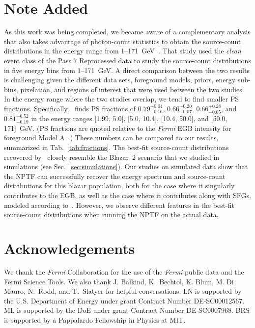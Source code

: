 \section*{Note Added}

As this work was being completed, we became aware of a complementary analysis that also takes advantage of photon-count statistics to obtain the source-count distributions in the energy range from 1--171~GeV~\cite{Zechlin:2016pme}.  That study used the {\it clean} event class of the Pass 7 Reprocessed data to study the source-count distributions in five energy bins from 1--171~GeV.  A direct comparison between the two results is challenging given the different data sets, foreground models, priors, energy sub-bins, pixelation, and regions of interest that were used between the two studies.  In the energy range where the two studies overlap, we tend to find smaller PS fractions.   %
Specifically,~\cite{Zechlin:2016pme} finds PS fractions of  $0.79_{-0.16}^{+0.04}$, $0.66_{-0.07}^{+0.20}$, $0.66_{-0.05}^{+0.28}$, and $0.81_{-0.19}^{+0.52}$ in the energy ranges [1.99, 5.0], [5.0, 10.4], [10.4, 50.0], and [50.0, 171]~GeV.  (PS fractions are quoted relative to the \emph{Fermi} EGB intensity for foreground Model A~\cite{Ackermann:2014usa}.)  These numbers can be compared to our results, summarized in Tab.~\ref{tab:fractions}.  The best-fit source-count distributions recovered by~\cite{Zechlin:2016pme} closely resemble the Blazar--2 scenario that we studied in simulations (see Sec.~\ref{sec:simulations}).  Our studies on simulated data show that the NPTF can successfully recover the energy spectrum and source-count distributions for this blazar population, both for the case where it singularly contributes to the EGB, as well as the case where it contributes along with SFGs, modeled according to~\cite{Tamborra:2014xia}.  However, we observe different features in the best-fit source-count distributions when running the NPTF on the actual data.  

\section*{Acknowledgements}

We thank the \emph{Fermi} Collaboration for the use of the \emph{Fermi} public data and the Fermi Science Tools.  We also thank J. Balkind, K.~Bechtol, K. Blum, M. Di Mauro, N.~Rodd, and T.~Slatyer for helpful conversations.  LN is supported by the U.S. Department of Energy under grant Contract
Number DE-SC00012567. ML is supported by the DoE under grant Contract Number DE-SC0007968.  BRS is supported by a Pappalardo Fellowship
in Physics at MIT.




